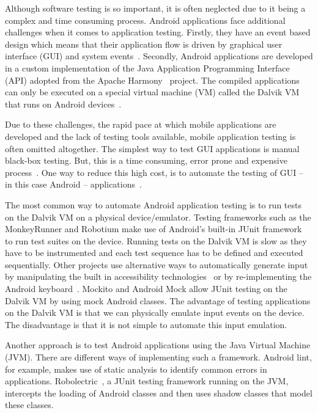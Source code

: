 \documentclass{acm_proc_article-sp}
\begin{document}
Although software testing is so important, it is often neglected due to it being a complex and time consuming process. Android
applications face additional challenges when it comes to application testing. Firstly, they have an event based design which means that
their application flow is driven by graphical user interface (GUI) and system events~\cite{Hu:2011}. Secondly, Android applications are
developed in a
custom implementation of the Java Application Programming Interface (API)  adopted from the Apache Harmony~\cite{harmony} project. The
compiled applications can only be executed on a special virtual machine (VM) called the Dalvik VM that runs on Android
devices~\cite{dalvik}.

Due to these challenges, the rapid pace at which mobile applications are developed and the lack of testing tools available, mobile
application testing is often omitted altogether. The simplest way to test GUI applications is manual black-box testing.
But, this is a time consuming, error prone and expensive process~\cite{AccessibilityTech}. One way to reduce this high cost, is to  automate
the testing of GUI -- in this case Android -- applications~\cite{AccessibilityTech}.

The most common way to automate Android application testing is to run tests on the Dalvik VM on a
physical device/emulator. Testing frameworks such as the MonkeyRunner and Robotium make use of Android's built-in JUnit
framework~\cite{TestingAndroid} to run test suites on the device. Running tests on the Dalvik VM is slow as they have to be instrumented and
each test sequence has to be defined and executed sequentially. Other projects use alternative ways to automatically generate input by
manipulating the built in accessibility technologies~\cite{AccessibilityTech} or by re-implementing the Android
keyboard~\cite{KeyboardModel}. Mockito and Android Mock allow JUnit testing on the Dalvik VM by using mock Android classes. The advantage of
testing applications on the Dalvik VM is that we can physically emulate input events on the device. The disadvantage is that it is not
simple to automate this input emulation. 

Another approach is to test Android applications using the Java Virtual Machine (JVM). There are different ways of implementing such
a framework. Android lint, for example, makes use of static analysis to identify common errors in applications.
Robolectric~\cite{robolectric}, a JUnit testing framework running on the JVM,  intercepts the loading of Android classes and then uses
shadow classes that model these classes.
\end{document}
